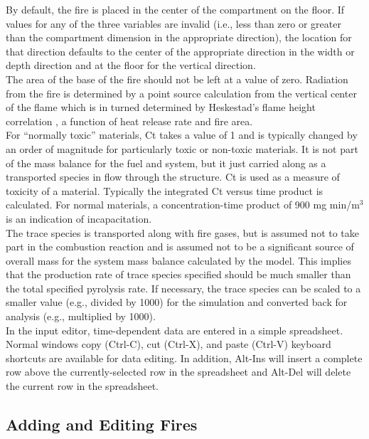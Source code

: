 {By default, the fire is placed in the center of the compartment on the floor.  If values for any of the three variables are invalid (i.e., less than zero or greater than the compartment dimension in the appropriate direction), the location for that direction defaults to the center of the appropriate direction in the width or depth direction and at the floor for the vertical direction. \\

The area of the base of the fire should not be left at a value of zero. Radiation from the fire is determined by a point source calculation from the vertical center of the flame which is in turned determined by Heskestad's flame height correlation \cite{Heskestad:2002}, a function of heat release rate and fire area. \\

For “normally toxic” materials, Ct takes a value of 1 and is typically changed by an order of magnitude for particularly toxic or non-toxic materials.  It is not part of the mass balance for the fuel and system, but it just carried along as a transported species in flow through the structure. Ct is used as a measure of toxicity of a material.  Typically the integrated Ct versus time product is calculated. For normal materials, a concentration-time product of 900 mg min/m$^3$ is an indication of incapacitation. \\

The trace species is transported along with fire gases, but is assumed not to take part in the combustion reaction and is assumed not to be a significant source of overall mass for the system mass balance calculated by the model. This implies that the production rate of trace species specified should be much smaller than the total specified pyrolysis rate. If necessary, the trace species can be scaled to a smaller value (e.g., divided by 1000) for the simulation and converted back for analysis (e.g., multiplied by 1000). \\

In the input editor, time-dependent data are entered in a simple spreadsheet. Normal windows copy (Ctrl-C), cut (Ctrl-X), and paste (Ctrl-V) keyboard shortcuts are available for data editing. In addition, Alt-Ins will insert a complete row above the currently-selected row in the spreadsheet and Alt-Del will delete the current row in the spreadsheet.
}

\subsection{Adding and Editing Fires}

